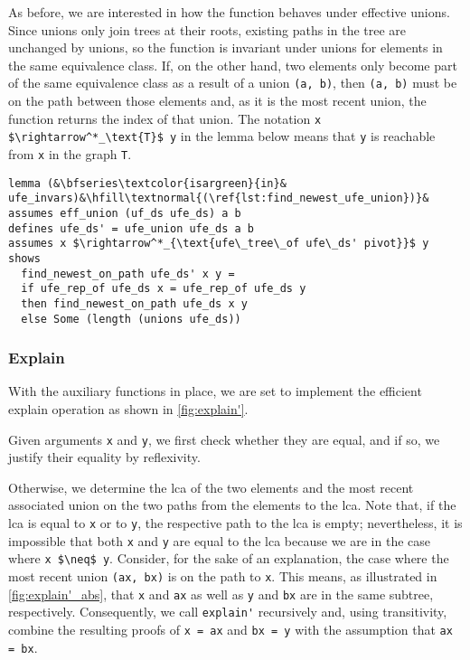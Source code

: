 \documentclass[
  sigplan,
  10pt,
  anonymous,
  review,
  ]{acmart}
\newcommand{\opexplain}{explain}
\begin{document}
As before, we are interested in how the function behaves under effective unions.
Since unions only join trees at their roots, existing paths in the tree are unchanged by unions,
so the function is invariant under unions for elements in the same equivalence class.
If, on the other hand, two elements only become part of the same equivalence class as a result of a union \lstinline|(a, b)|, then \lstinline|(a, b)| must be on the path between those elements and, as it is the most recent union, the function returns the index of that union.
The notation \lstinline|x $\rightarrow^*_\text{T}$ y| in the lemma below means that \lstinline|y| is reachable from \lstinline|x| in the graph \lstinline|T|.
\begin{lstlisting}[caption={[empty]}, label={lst:find_newest_ufe_union}]
lemma (&\bfseries\textcolor{isargreen}{in}& ufe_invars)&\hfill\textnormal{(\ref{lst:find_newest_ufe_union})}&
assumes eff_union (uf_ds ufe_ds) a b
defines ufe_ds' = ufe_union ufe_ds a b
assumes x $\rightarrow^*_{\text{ufe\_tree\_of ufe\_ds' pivot}}$ y
shows
  find_newest_on_path ufe_ds' x y =
  if ufe_rep_of ufe_ds x = ufe_rep_of ufe_ds y
  then find_newest_on_path ufe_ds x y
  else Some (length (unions ufe_ds))
\end{lstlisting}

\subsubsection{Explain}
With the auxiliary functions in place, we are set to implement the efficient \opexplain{} operation as shown in \autoref{fig:explain'}.

Given arguments \lstinline|x| and \lstinline|y|, we first check whether they are equal, and if so, we justify their equality by reflexivity.

Otherwise, we determine the \acrshort{lca} of the two elements and the most recent associated union on the two paths from the elements to the \acrshort{lca}.
Note that, if the \acrshort{lca} is equal to \lstinline|x| or to \lstinline|y|, the respective path to the \acrshort{lca} is empty;
nevertheless, it is impossible that both \lstinline|x| and \lstinline|y| are equal to the \acrshort{lca} because we are in the case where \lstinline|x $\neq$ y|.
Consider, for the sake of an explanation, the case where the most recent union \lstinline|(ax, bx)| is on the path to \lstinline|x|.
This means, as illustrated in \autoref{fig:explain'_abs}, that \lstinline|x| and \lstinline|ax| as well as \lstinline|y| and \lstinline|bx| are in the same subtree, respectively.
Consequently, we call \lstinline|explain'| recursively and, using transitivity, combine the resulting proofs of \lstinline|x = ax| and \lstinline|bx = y| with the assumption that \lstinline|ax = bx|.
\end{document}
